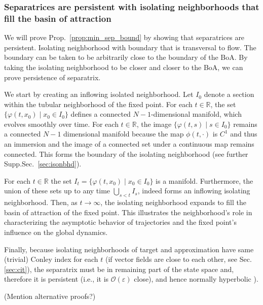 \documentclass{article}
\newcommand{\ascomment}[1]{\textcolor{ascolor}{(#1)}}
\newcommand{\reals}{\mathbb{R}}
\newcounter{ct}
\begin{document}
\subsubsection{Separatrices are persistent with isolating neighborhoods that fill the basin of attraction}
We will prove Prop.~\ref{prop:min_sep_bound} by showing that separatrices are persistent.
Isolating neighborhood with boundary that is transversal to flow.
The boundary can be taken to be arbitrarily close to the boundary of the BoA.
By taking the isolating neighborhood to be closer and closer to the BoA, we can prove persistence of separatrix.

We start by creating an inflowing isolated neighborhood.
 Let $I_0$ denote a section within the tubular neighborhood of the fixed point.
For each $t\in\reals$, the set $\{\varphi(t,x_0) \mid x_0\in I_0\}$ defines a connected $N-1$-dimensional manifold, which evolves smoothly over time. 
For each \( t \in \reals \), the image \( \{ \varphi(t, s) \mid s \in I_0 \} \) remains a connected $N-1$ dimensional manifold because the map \( \phi(t, \cdot) \) is \( C^1 \) and thus an immersion and the image of a connected set under a continuous map remains connected.
This forms the boundary of the isolating neighborhood (see further Supp.Sec.~\ref{sec:isonbhd}).

For each $t\in\reals$ the set $I_t = \{\varphi(t,x_0) \mid x_0 \in I_0 \}$ is a manifold.
Furthermore, the union of these sets up to any time  $\bigcup_{s<t}I_s$, indeed forms an inflowing isolating neighborhood.
%
Then, as $t\rightarrow\infty$, the isolating neighborhood expands to fill the basin of attraction of the fixed point.
 This illustrates the neighborhood’s role in characterizing the asymptotic behavior of trajectories and the fixed point’s influence on the global dynamics.

Finally, because isolating neighborhoods of target and approximation have same (trivial) Conley index  for each $t$ (if vector fields are close to each other, see Sec.\ref{sec:cit}),
the separatrix must be in remaining part of the state space and, therefore it is persistent (i.e., it is $\mathcal{O}(\varepsilon)$ close), and hence normally hyperbolic  \citep{mane1978persistent}).

\ascomment{Mention alternative proofs?}
\end{document}
